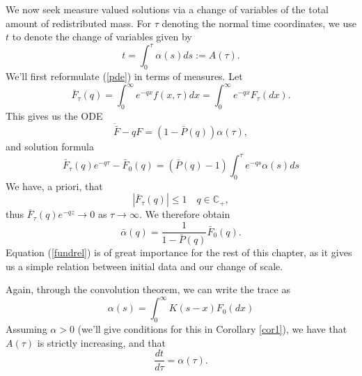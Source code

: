 We now seek measure valued solutions via a change of variables of the total amount of redistributed mass.  For $\tau$ denoting the normal time coordinates, we use $t$ to denote the change of variables given by
\begin{equation}
t = \int_0^\tau \alpha(s)ds:= A(\tau).
\end{equation}
We'll first reformulate (\ref{pde}) in terms of measures.  Let 
\begin{equation}
\bar F_\tau(q) = \int_0^\infty e^{-qx} f(x,\tau)dx = \int_0^\infty e^{-qx} F_\tau(dx).
\end{equation}
This gives us the ODE 
\begin{equation}\label{measode}
\dot{\bar F}- qF = (1-\bar P(q))\alpha(\tau),
\end{equation}
and solution formula
\begin{equation}
\bar F_\tau(q)e^{-q\tau}- \bar F_0(q) = (\bar P(q)-1)\int_0^\tau e^{-qs}\alpha(s)ds
\end{equation}
We have, a priori, that 
\begin{equation}
|\bar F_\tau(q)| \le 1 \quad q \in \mathbb C_+,
\end{equation}
thus  $\bar F_\tau(q)e^{-qz} \rightarrow 0$ as $\tau \rightarrow \infty$.  We therefore obtain
\begin{equation}\label{fundrel}
\bar \alpha (q) = \frac{1}{1-\bar P(q)}\bar F_0(q).
\end{equation}
Equation (\ref{fundrel}) is of great importance for the rest of this chapter, as it gives us a simple relation between initial data and our change of scale.  

Again, through the convolution theorem, we can write the trace as
\begin{equation}
\alpha(s) = \int_0^\infty K(s-x)F_0(dx)
\end{equation}
Assuming $\alpha >0$ (we'll give conditions for this in Corollary \ref{cor1}), we have that $A(\tau)$ is strictly increasing, and that 
\begin{equation}
\frac{dt}{d\tau} = \alpha(\tau).
\end{equation}
  
